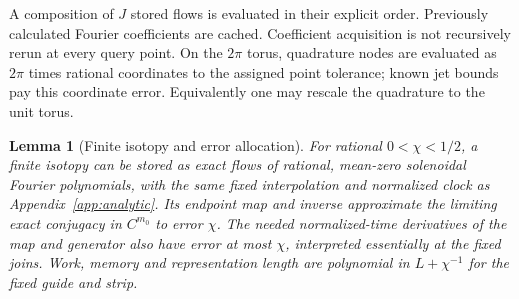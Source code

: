 \documentclass[11pt,a4paper]{amsart}
\newtheorem{lemma}[theorem]{Lemma}
\theoremstyle{definition}
\theoremstyle{remark}
\numberwithin{equation}{section}
\begin{document}
A composition of $J$ stored flows is evaluated in their explicit order. Previously calculated Fourier coefficients are cached. Coefficient acquisition is not recursively rerun at every query point. On the $2\pi$ torus, quadrature nodes are evaluated as $2\pi$ times rational coordinates to the assigned point tolerance; known jet bounds pay this coordinate error. Equivalently one may rescale the quadrature to the unit torus.

\begin{lemma}[Finite isotopy and error allocation]\label{lem:finiteguide}
For rational $0<\chi<1/2$, a finite isotopy can be stored as exact flows of rational, mean-zero solenoidal Fourier polynomials, with the same fixed interpolation and normalized clock as Appendix~\ref{app:analytic}. Its endpoint map and inverse approximate the limiting exact conjugacy in $C^{m_0}$ to error $\chi$. The needed normalized-time derivatives of the map and generator also have error at most $\chi$, interpreted essentially at the fixed joins. Work, memory and representation length are polynomial in $L+\chi^{-1}$ for the fixed guide and strip.
\end{lemma}
\end{document}
